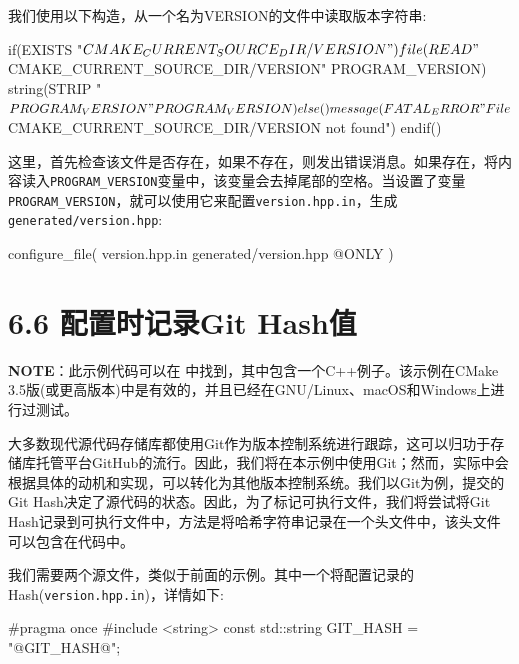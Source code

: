 
我们使用以下构造，从一个名为VERSION的文件中读取版本字符串:

\begin{codebox}[cmake]
if(EXISTS "${CMAKE_CURRENT_SOURCE_DIR}/VERSION")
  file(READ "${CMAKE_CURRENT_SOURCE_DIR}/VERSION" PROGRAM_VERSION)
  string(STRIP "${PROGRAM_VERSION}" PROGRAM_VERSION)
else()
    message(FATAL_ERROR "File ${CMAKE_CURRENT_SOURCE_DIR}/VERSION not found")
endif()
\end{codebox}

这里，首先检查该文件是否存在，如果不存在，则发出错误消息。如果存在，将内容读入\texttt{PROGRAM\_VERSION}变量中，该变量会去掉尾部的空格。当设置了变量\texttt{PROGRAM\_VERSION}，就可以使用它来配置\texttt{version.hpp.in}，生成\texttt{ generated/version.hpp}:

\begin{codebox}[cmake]
configure_file(
  version.hpp.in
  generated/version.hpp
  @ONLY
  )
\end{codebox}


\section{6.6 配置时记录Git Hash值}

\begin{myInfoBox}
\textbf{NOTE}：此示例代码可以在  中找到，其中包含一个C++例子。该示例在CMake 3.5版(或更高版本)中是有效的，并且已经在GNU/Linux、macOS和Windows上进行过测试。
\end{myInfoBox}

大多数现代源代码存储库都使用Git作为版本控制系统进行跟踪，这可以归功于存储库托管平台GitHub的流行。因此，我们将在本示例中使用Git；然而，实际中会根据具体的动机和实现，可以转化为其他版本控制系统。我们以Git为例，提交的Git Hash决定了源代码的状态。因此，为了标记可执行文件，我们将尝试将Git Hash记录到可执行文件中，方法是将哈希字符串记录在一个头文件中，该头文件可以包含在代码中。


我们需要两个源文件，类似于前面的示例。其中一个将配置记录的Hash(\texttt{version.hpp.in})，详情如下:

\begin{codebox}[cpp]
#pragma once
#include <string>
const std::string GIT_HASH = "@GIT_HASH@";
\end{codebox}


